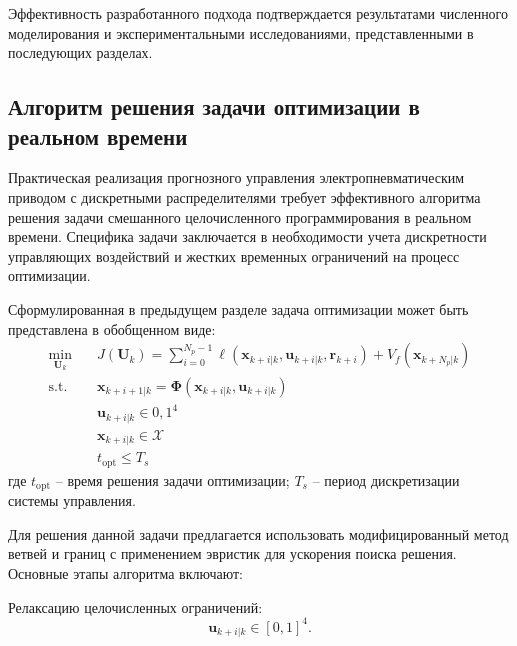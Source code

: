 Эффективность разработанного подхода подтверждается результатами численного моделирования и экспериментальными
исследованиями, представленными в последующих разделах.

\subsection{Алгоритм решения задачи оптимизации в реальном времени}\label{subsec:ch3/sec5/sub4}

Практическая реализация прогнозного управления электропневматическим
приводом с дискретными распределителями требует эффективного алгоритма
решения задачи смешанного целочисленного программирования в реальном времени.
Специфика задачи заключается в необходимости учета дискретности управляющих воздействий и
жестких временных ограничений на процесс оптимизации.

Сформулированная в предыдущем разделе задача оптимизации может быть представлена в обобщенном виде:
\begin{equation}
	\begin{aligned}
		\min_{\mathbf{U}_k} \quad & J(\mathbf{U}_k) = \sum_{i=0}^{N_p-1} \ell(\mathbf{x}_{k+i|k}, \mathbf{u}_{k+i|k}, \mathbf{r}_{k+i}) + V_f(\mathbf{x}_{k+N_p|k}) \\
		\text{s.t.} \quad         & \mathbf{x}_{k+i+1|k} = \boldsymbol{\Phi}(\mathbf{x}_{k+i|k}, \mathbf{u}_{k+i|k})                                                \\
		                          & \mathbf{u}_{k+i|k} \in {0,1}^4                                                                                                  \\
		                          & \mathbf{x}_{k+i|k} \in \mathcal{X}                                                                                              \\
		                          & t_{\text{opt}} \leq T_s
	\end{aligned}
\end{equation}
где $t_{\text{opt}}$ -- время решения задачи оптимизации;
$T_s$ -- период дискретизации системы управления.

Для решения данной задачи предлагается использовать модифицированный метод ветвей
и границ с применением эвристик для ускорения поиска решения. Основные этапы алгоритма включают:

Релаксацию целочисленных ограничений:
\begin{equation*}
	\mathbf{u}_{k+i|k} \in [0,1]^4.
\end{equation*}

